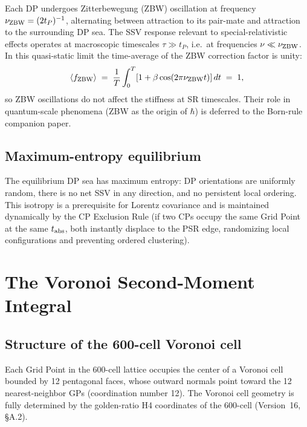 \documentclass[12pt]{article}
\newcommand{\tP}{t_P}
\begin{document}
Each DP undergoes Zitterbewegung (ZBW) oscillation at frequency
$\nu_{\rm ZBW} = (2\tP)^{-1}$, alternating between attraction to its
pair-mate and attraction to the surrounding DP sea.  The SSV response relevant
to special-relativistic effects operates at macroscopic timescales
$\tau \gg \tP$, i.e.\ at frequencies $\nu \ll \nu_{\rm ZBW}$.  In this
quasi-static limit the time-average of the ZBW correction factor is unity:
\begin{equation}
  \langle f_{\rm ZBW}\rangle \;=\;
  \frac{1}{T}\int_0^T [1 + \beta\cos(2\pi\nu_{\rm ZBW} t)]\,dt
  \;=\; 1,
  \label{eq:ZBW}
\end{equation}
so ZBW oscillations do not affect the stiffness at SR timescales.  Their role
in quantum-scale phenomena (ZBW as the origin of $\hbar$) is deferred to the
Born-rule companion paper.

\subsection{Maximum-entropy equilibrium}

The equilibrium DP sea has maximum entropy: DP orientations are uniformly
random, there is no net SSV in any direction, and no persistent local
ordering.  This isotropy is a prerequisite for Lorentz covariance and is
maintained dynamically by the CP Exclusion Rule (if two CPs occupy the same
Grid Point at the same $t_{\rm abs}$, both instantly displace to the PSR edge,
randomizing local configurations and preventing ordered clustering).

\section{The Voronoi Second-Moment Integral}
\label{sec:voronoi}

\subsection{Structure of the 600-cell Voronoi cell}

Each Grid Point in the 600-cell lattice occupies the center of a Voronoi
cell bounded by 12 pentagonal faces, whose outward normals point toward the
12 nearest-neighbor GPs (coordination number 12).  The Voronoi cell geometry
is fully determined by the golden-ratio H4 coordinates of the 600-cell
(Version~16, \S A.2).
\end{document}
